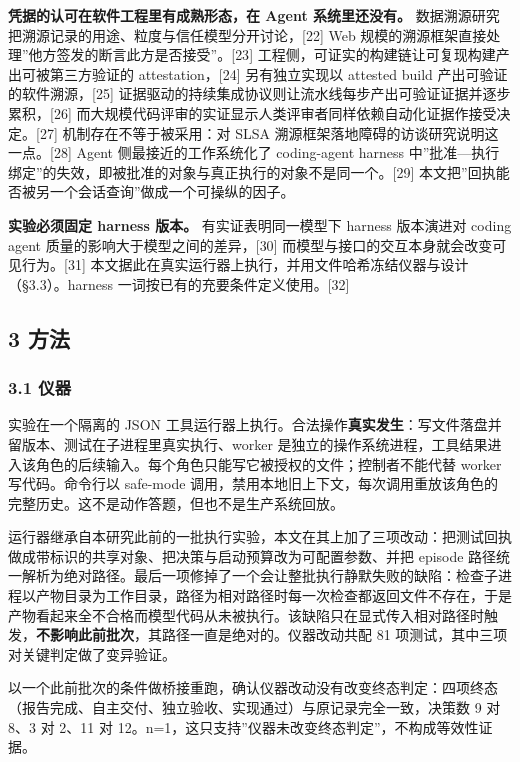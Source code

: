 \documentclass[
]{article}
\begin{document}
\textbf{凭据的认可在软件工程里有成熟形态，在 Agent 系统里还没有。}
数据溯源研究把溯源记录的用途、粒度与信任模型分开讨论，{[}22{]} Web
规模的溯源框架直接处理''他方签发的断言此方是否接受''。{[}23{]}
工程侧，可证实的构建链让可复现构建产出可被第三方验证的
attestation，{[}24{]} 另有独立实现以 attested build
产出可验证的软件溯源，{[}25{]}
证据驱动的持续集成协议则让流水线每步产出可验证证据并逐步累积，{[}26{]}
而大规模代码评审的实证显示人类评审者同样依赖自动化证据作接受决定。{[}27{]}
机制存在不等于被采用：对 SLSA
溯源框架落地障碍的访谈研究说明这一点。{[}28{]} Agent
侧最接近的工作系统化了 coding-agent harness
中''批准---执行绑定''的失效，即被批准的对象与真正执行的对象不是同一个。{[}29{]}
本文把''回执能否被另一个会话查询''做成一个可操纵的因子。

\textbf{实验必须固定 harness 版本。} 有实证表明同一模型下 harness
版本演进对 coding agent 质量的影响大于模型之间的差异，{[}30{]}
而模型与接口的交互本身就会改变可见行为。{[}31{]}
本文据此在真实运行器上执行，并用文件哈希冻结仪器与设计（§3.3）。harness
一词按已有的充要条件定义使用。{[}32{]}

\subsection{3 方法}\label{ux65b9ux6cd5}

\subsubsection{3.1 仪器}\label{ux4eeaux5668}

实验在一个隔离的 JSON
工具运行器上执行。合法操作\textbf{真实发生}：写文件落盘并留版本、测试在子进程里真实执行、worker
是独立的操作系统进程，工具结果进入该角色的后续输入。每个角色只能写它被授权的文件；控制者不能代替
worker 写代码。命令行以 safe-mode
调用，禁用本地旧上下文，每次调用重放该角色的完整历史。这不是动作答题，但也不是生产系统回放。

运行器继承自本研究此前的一批执行实验，本文在其上加了三项改动：把测试回执做成带标识的共享对象、把决策与启动预算改为可配置参数、并把
episode
路径统一解析为绝对路径。最后一项修掉了一个会让整批执行静默失败的缺陷：检查子进程以产物目录为工作目录，路径为相对路径时每一次检查都返回文件不存在，于是产物看起来全不合格而模型代码从未被执行。该缺陷只在显式传入相对路径时触发，\textbf{不影响此前批次}，其路径一直是绝对的。仪器改动共配
81 项测试，其中三项对关键判定做了变异验证。

以一个此前批次的条件做桥接重跑，确认仪器改动没有改变终态判定：四项终态（报告完成、自主交付、独立验收、实现通过）与原记录完全一致，决策数
9 对 8、3 对 2、11 对
12。n=1，这只支持''仪器未改变终态判定''，不构成等效性证据。
\end{document}
